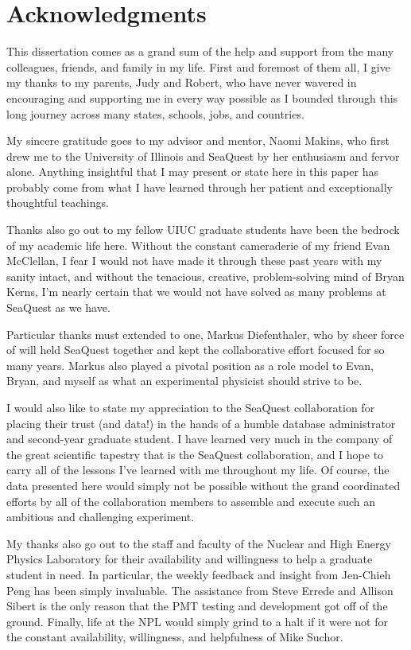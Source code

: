 \documentclass[edeposit,fullpage]{uiucthesis2009}
\begin{document}
\chapter*{Acknowledgments}

This dissertation comes as a grand sum of the help and support from the many colleagues, friends, and family in my life. First and foremost of them all, I give my thanks to my parents, Judy and Robert, who have never wavered in encouraging and supporting me in every way possible as I bounded through this long journey across many states, schools, jobs, and countries.

My sincere gratitude goes to my advisor and mentor, Naomi Makins, who first drew me to the University of Illinois and SeaQuest by her enthusiasm and fervor alone. Anything insightful that I may present or state here in this paper has probably come from what I have learned through her patient and exceptionally thoughtful teachings.

Thanks also go out to my fellow UIUC graduate students have been the bedrock of my academic life here. Without the constant cameraderie of my friend Evan McClellan, I fear I would not have made it through these past years with my sanity intact, and without the tenacious, creative, problem-solving mind of Bryan Kerns, I'm nearly certain that we would not have solved as many problems at SeaQuest as we have.

Particular thanks must extended to one, Markus Diefenthaler, who by sheer force of will held SeaQuest together and kept the collaborative effort focused for so many years. Markus also played a pivotal position as a role model to Evan, Bryan, and myself as what an experimental physicist should strive to be.

I would also like to state my appreciation to the SeaQuest collaboration for placing their trust (and data!) in the hands of a humble database administrator and second-year graduate student. I have learned very much in the company of the great scientific tapestry that is the SeaQuest collaboration, and I hope to carry all of the lessons I've learned with me throughout my life. Of course, the data presented here would simply not be possible without the grand coordinated efforts by all of the collaboration members to assemble and execute such an ambitious and challenging experiment.

My thanks also go out to the staff and faculty of the Nuclear and High Energy Physics Laboratory for their availability and willingness to help a graduate student in need. In particular, the weekly feedback and insight from Jen-Chieh Peng has been simply invaluable. The assistance from Steve Errede and Allison Sibert is the only reason that the PMT testing and development got off of the ground. Finally, life at the NPL would simply grind to a halt if it were not for the constant availability, willingness, and helpfulness of Mike Suchor.
\end{document}
